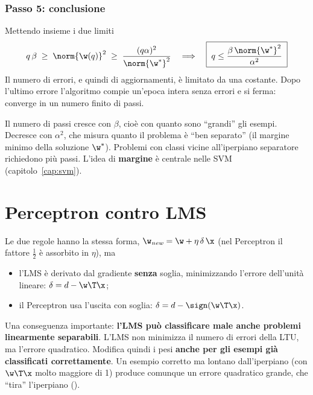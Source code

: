 \subsubsection{Passo 5: conclusione}
Mettendo insieme i due limiti
\[
q\,\beta \;\ge\; \norm{\w(q)}^2 \;\ge\; \frac{(q\alpha)^2}{\norm{\w^*}^2}
\quad\Longrightarrow\quad
\boxed{\;q \le \frac{\beta\,\norm{\w^*}^2}{\alpha^2}\;}
\]
Il numero di errori, e quindi di aggiornamenti, è limitato da una costante. Dopo l'ultimo errore l'algoritmo
compie un'epoca intera senza errori e si ferma: converge in un numero finito di passi. \hfill\qedsymbol

\begin{idea}
Il numero di passi cresce con $\beta$, cioè con quanto sono ``grandi'' gli esempi. Decresce con $\alpha^2$, che
misura quanto il problema è ``ben separato'' (il margine minimo della soluzione $\w^*$). Problemi con classi
vicine all'iperpiano separatore richiedono più passi. L'idea di \textbf{margine} è centrale nelle SVM
(capitolo~\ref{cap:svm}).
\end{idea}

\section{Perceptron contro LMS}

Le due regole hanno la stessa forma, $\w_{\mathit{new}} = \w+\eta\,\delta\,\x$ (nel Perceptron il fattore
$\tfrac12$ è assorbito in $\eta$), ma
\begin{itemize}
  \item l'LMS è derivato dal gradiente \textbf{senza} soglia, minimizzando l'errore dell'unità lineare:
        $\delta = d - \w\T\x$;
  \item il Perceptron usa l'uscita con soglia: $\delta = d-\sign(\w\T\x)$.
\end{itemize}
Una conseguenza importante: \textbf{l'LMS può classificare male anche problemi linearmente separabili}. L'LMS non
minimizza il numero di errori della LTU, ma l'errore quadratico. Modifica quindi i pesi \textbf{anche per gli
esempi già classificati correttamente}. Un esempio corretto ma lontano dall'iperpiano (con $\w\T\x$ molto maggiore
di 1) produce comunque un errore quadratico grande, che ``tira'' l'iperpiano ().

